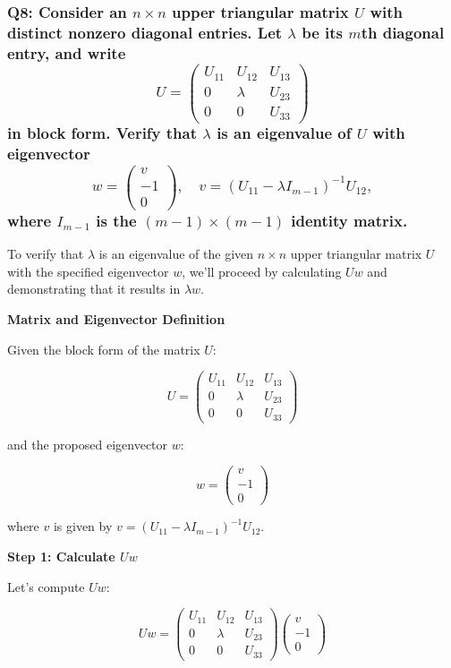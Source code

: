 \documentclass[8pt]{article}
\begin{document}
{{\subsubsection*{Q8: Consider an \(n \times n\) upper triangular matrix \(U\) with distinct nonzero diagonal entries. Let \(\lambda\) be its \(m\)th diagonal entry, and write
\[
U = \begin{pmatrix}
U_{11} & U_{12} & U_{13} \\
0 & \lambda & U_{23} \\
0 & 0 & U_{33}
\end{pmatrix}
\]
in block form. Verify that \(\lambda\) is an eigenvalue of \(U\) with eigenvector
\[
w = \begin{pmatrix}
v \\
-1 \\
0
\end{pmatrix}, \quad v = (U_{11} - \lambda I_{m-1})^{-1} U_{12},
\]
where \(I_{m-1}\) is the \((m - 1) \times (m - 1)\) identity matrix.}

To verify that \(\lambda\) is an eigenvalue of the given \(n \times n\) upper triangular matrix \(U\) with the specified eigenvector \(w\), we'll proceed by calculating \(Uw\) and demonstrating that it results in \(\lambda w\).

\textbf{Matrix and Eigenvector Definition}

Given the block form of the matrix \(U\):

\[
U = \begin{pmatrix}
U_{11} & U_{12} & U_{13} \\
0 & \lambda & U_{23} \\
0 & 0 & U_{33}
\end{pmatrix}
\]

and the proposed eigenvector \(w\):

\[
w = \begin{pmatrix}
v \\
-1 \\
0
\end{pmatrix}
\]

where \(v\) is given by \(v = (U_{11} - \lambda I_{m-1})^{-1} U_{12}\).

\textbf{Step 1: Calculate \(Uw\)}

Let's compute \(Uw\):

\[
Uw = \begin{pmatrix}
U_{11} & U_{12} & U_{13} \\
0 & \lambda & U_{23} \\
0 & 0 & U_{33}
\end{pmatrix} \begin{pmatrix}
v \\
-1 \\
0
\end{pmatrix}
\]

}}
\end{document}
